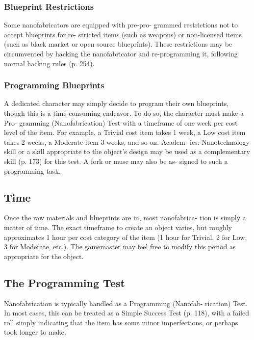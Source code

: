 \subsubsection{Blueprint Restrictions}

Some nanofabricators are equipped with pre-pro-
grammed restrictions not to accept blueprints for re-
stricted items (such as weapons) or non-licensed items 
(such as black market or open source blueprints). 
These restrictions may be circumvented by hacking 
the nanofabricator and re-programming it, following 
normal hacking rules (p. 254).

\subsubsection{Programming Blueprints}

A dedicated character may simply decide to program 
their own blueprints, though this is a time-consuming 
endeavor. To do so, the character must make a Pro-
gramming (Nanofabrication) Test with a timeframe 
of one week per cost level of the item. For example, a 
Trivial cost item takes 1 week, a Low cost item takes 2 
weeks, a Moderate item 3 weeks, and so on. Academ-
ics: Nanotechnology skill or a skill appropriate to the 
object's design may be used as a complementary skill 
(p. 173) for this test. A fork or muse may also be as-
signed to such a programming task.

\subsection{Time}

Once the raw materials and blueprints are in, most nanofabrica-
tion is simply a matter of time. The exact timeframe to create an 
object varies, but roughly approximates 1 hour per cost category of 
the item (1 hour for Trivial, 2 for Low, 3 for Moderate, etc.). The 
gamemaster may feel free to modify this period as appropriate for 
the object.

\subsection{The Programming Test}

Nanofabrication is typically handled as a Programming (Nanofab-
rication) Test. In most cases, this can be treated as a Simple Success 
Test (p. 118), with a failed roll simply indicating that the item has 
some minor imperfections, or perhaps took longer to make.

